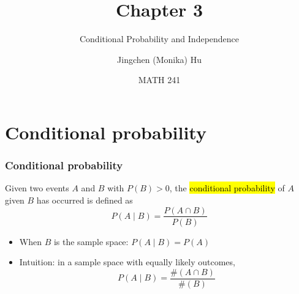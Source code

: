 \documentclass[slidestop,compress,mathserif]{beamer}
\title[Chapter 3]{Chapter 3}
\subtitle{Conditional Probability and Independence}
\author[Jingchen (Monika) Hu] %
{Jingchen (Monika) Hu}
\institute[Vassar] %
{Vassar College}
\date[MATH 241] %
{MATH 241}
\begin{document}


\begin{frame}%
\titlepage
\end{frame}

%
%
%


\section{Conditional probability}
\begin{frame}\frametitle{Conditional probability}

\begin{defn}
Given two events $A$ and $B$ with $P(B) > 0$, the \hl{conditional
probability} of $A$ given $B$ has occurred is defined as
\[P(A\mid B)=\frac{P(A\cap B)}{P(B)}\]
\end{defn}
\pause
\begin{itemize}
\item When $B$ is the sample space: $P(A \mid B) = P(A)$
\item Intuition: in a sample space with equally likely outcomes,
\[P(A \mid B) = \frac{\#(A \cap B)}{\#(B)}\]
\end{itemize}

\end{frame}
\end{document}
